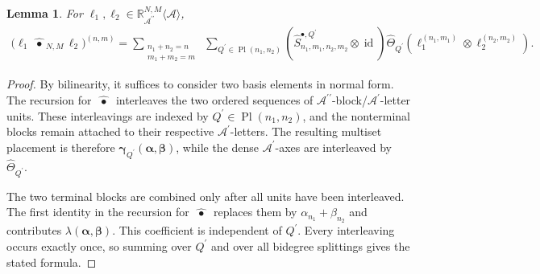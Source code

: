\documentclass{amsart}
\newtheorem{lemma}[theorem]{Lemma}
\theoremstyle{definition}
\theoremstyle{remark}
\newcommand{\gammashuffle}{{\,\bullet\,}}
\newcommand{\gammashufflesym}{{\,\widehat{\gammashuffle}\,}}
\begin{document}
\begin{lemma}
\label{lem:gamma_shuffle_sym}
For
$\ell_1,\ell_2
\in
\mathbb{R}_{\mathcal{A}^{\prime\prime}}^{N,M}
\langle\mathcal{A}\rangle$,
\[
\begin{aligned}
    \bigl(
        \ell_1
        \gammashufflesym_{N,M}
        \ell_2
    \bigr)^{(n,m)}
    =
    \sum_{\substack{
        n_1+n_2=n\\
        m_1+m_2=m
    }}
    \;
    \sum_{
        Q^{\prime}
        \in
        \operatorname{Pl}(n_1,n_2)
    }
    \left(
        \widehat{S}^{\bullet,Q^{\prime}}_{n_1,m_1,n_2,m_2}
        \otimes
        \operatorname{id}
    \right)
    \widehat{\Theta}_{Q^{\prime}}
    \left(
        \ell_1^{(n_1,m_1)}
        \otimes
        \ell_2^{(n_2,m_2)}
    \right).
\end{aligned}
\]
\end{lemma}

\begin{proof}
By bilinearity, it suffices to consider two basis elements in normal form.
The recursion for $\gammashufflesym$ interleaves the two ordered sequences
of
$\mathcal{A}^{\prime\prime}$-block/$\mathcal{A}^{\prime}$-letter units.
These interleavings are indexed by
$Q^{\prime}\in\operatorname{Pl}(n_1,n_2)$, and the nonterminal blocks
remain attached to their respective
$\mathcal{A}^{\prime}$-letters. The resulting multiset placement is
therefore
$\boldsymbol{\gamma}_{Q^{\prime}}
(\boldsymbol{\alpha},\boldsymbol{\beta})$, while the dense
$\mathcal{A}^{\prime}$-axes are interleaved by
$\widehat{\Theta}_{Q^{\prime}}$.

The two terminal blocks are combined only after all units have been
interleaved. The first identity in the recursion for
$\gammashufflesym$ replaces them by
$\alpha_{n_1}+\beta_{n_2}$ and contributes
$\lambda(\boldsymbol{\alpha},\boldsymbol{\beta})$. This coefficient is
independent of $Q^{\prime}$. Every interleaving occurs exactly once, so
summing over $Q^{\prime}$ and over all bidegree splittings gives the stated
formula.
\end{proof}
\end{document}
